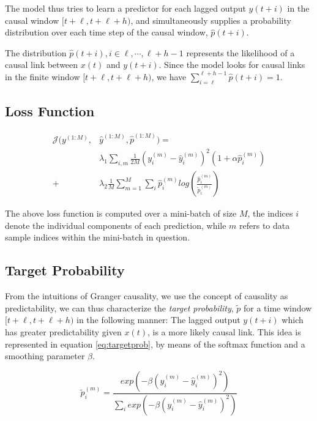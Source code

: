 \documentclass[runningheads]{llncs}
\begin{document}
The model thus tries to learn a predictor for each lagged output $y(t+i)$ in the causal window 
$[t+\ell, t+\ell+h)$, and simultaneously supplies a probability distribution over each time step 
of the causal window, $\hat{p}(t+i)$.

The distribution $\hat{p}(t+i), i \in {\ell, \cdots, \ell+h-1}$ represents the 
likelihood of a causal link between $x(t)$ and $y(t+i)$. Since the model looks
for causal links in the finite window $[t+\ell, t+\ell+h)$, we have 
$\sum^{\ell+h-1}_{i = \ell}{\hat{p}(t + i)} = 1$.


\subsection{Loss Function}

\begin{equation}\label{eq:loss}
\begin{aligned}
\mathcal{J}(y^{(1:M)}, &\hat{y}^{(1:M)}, \hat{p}^{(1:M)}) =\\ 
&\lambda_1 \sum_{i,m}{\frac{1}{2M} (y^{(m)}_{i} - \hat{y}^{(m)}_{i})^2 (1 + \alpha \hat{p}^{(m)}_i)} \\ 
+ &\lambda_2 \frac{1}{M} \sum_{m = 1}^{M}{\sum_{i}{\hat{p}^{(m)}_{i}log \left (\frac{\hat{p}^{(m)}_i}{\tilde{p}^{(m)}_i} \right)}}
\end{aligned}
\end{equation}
      

The above loss function is computed over a mini-batch of size $M$, the indices $i$ denote the
individual components of each prediction, while $m$ refers to data sample indices within the
mini-batch in question.


\subsection{Target Probability}\label{sec:targetprob}

From the intuitions of Granger causality, we use the concept of causality as predictability, 
we can thus characterize the \emph{target probability}, $\widetilde{p}$ for a time window 
$[t+\ell, t+\ell+h)$ in the following manner: The lagged output $y(t+i)$ which has greater 
predictability given $x(t)$, is a more likely causal link. This idea is represented in 
equation \ref{eq:targetprob}, by means of the softmax function and a smoothing parameter 
$\beta$.

\begin{equation}\label{eq:targetprob}
\widetilde{p}_{i}^{(m)} = \frac{exp \left(- \beta (y_{i}^{(m)} - \hat{y}_{i}^{(m)})^{2} \right)}
{\sum_{i}{exp \left(- \beta (y_{i}^{(m)} - \hat{y}_{i}^{(m)})^{2} \right)}} 
\end{equation}
\end{document}
